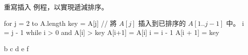 \startEXERCISE
重寫插入 例程，以實現遞減排序。
\stopEXERCISE
\startANSWER

\startCLRSCODE
for j = 2 to A.length
	key = A[j]
	// 將 $A[j]$ 插入到已排序的 $A[1 .. j-1]$ 中。
	i = j - 1
	while i > 0 and A[i] > key
		A[i+1] = A[i]
		i = i - 1
	A[i + 1] = key
\stopCLRSCODE

{\externalfigure[e2_1_2-2]}{b}
{\externalfigure[e2_1_2-3]}{c}
{\externalfigure[e2_1_2-4]}{d}
{\externalfigure[e2_1_2-5]}{e}
{\externalfigure[e2_1_2-6]}{f}
\stopcombination
\stopANSWER
